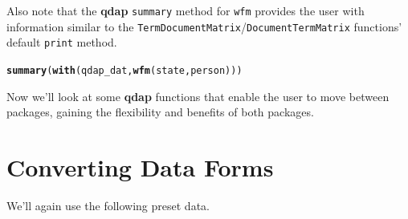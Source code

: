 \documentclass{article}\usepackage[]{graphicx}\usepackage[]{color}
\makeatletter
\newcommand{\hlstd}[1]{\textcolor[rgb]{0.345,0.345,0.345}{#1}}%
\newcommand{\hlkwd}[1]{\textcolor[rgb]{0.737,0.353,0.396}{\textbf{#1}}}%
\newenvironment{kframe}{%
 \def\at@end@of@kframe{}%
 \ifinner\ifhmode%
  \def\at@end@of@kframe{\end{minipage}}%
  \begin{minipage}{\columnwidth}%
 \fi\fi%
 \def\FrameCommand##1{\hskip\@totalleftmargin \hskip-\fboxsep
 \colorbox{shadecolor}{##1}\hskip-\fboxsep
     \hskip-\linewidth \hskip-\@totalleftmargin \hskip\columnwidth}%
 \MakeFramed {\advance\hsize-\width
   \@totalleftmargin\z@ \linewidth\hsize
   \@setminipage}}%
 {\par\unskip\endMakeFramed%
 \at@end@of@kframe}
\newenvironment{knitrout}{}{} %
\makeatother
\begin{document}
Also note that the \textbf{qdap} \texttt{summary} method for \texttt{wfm} provides the user with information similar to the \texttt{TermDocumentMatrix}/\texttt{DocumentTermMatrix} functions' default \texttt{print} method.


\begin{knitrout}
\color{fgcolor}\begin{kframe}
\begin{alltt}
\hlkwd{summary}\hlstd{(}\hlkwd{with}\hlstd{(qdap_dat,} \hlkwd{wfm}\hlstd{(state, person)))}
\end{alltt}
\end{kframe}
\end{knitrout}


\begin{knitrout}
\color{fgcolor}\begin{kframe}


{\ttfamily\noindent\itshape\color{messagecolor}{\#\# A word-frequency matrix (16 terms, 5 groups)\\\#\# \\\#\# \\\#\# Non-/sparse entries\ \ \ \ \ \  : 17/63\\\#\# Sparsity\ \ \ \ \ \ \ \ \ \ \ \ \ \ \ \ \ \ : 79\%\\\#\# Maximal term length\ \ \ \ \ \  : 8\\\#\# Less than four characters : 56\%\\\#\# Hapax legomenon\ \ \ \ \ \ \ \ \ \  : 13(81\%)\\\#\# Dis legomenon\ \ \ \ \ \ \ \ \ \ \ \  : 3(19\%)\\\#\# Shannon's diversity index : 2.73}}\end{kframe}
\end{knitrout}


Now we'll look at some \textbf{qdap} functions that enable the user to move between packages, gaining the flexibility and benefits of both packages.


\section{Converting Data Forms}

\hspace{.4cm} We'll again use the following preset data.
\end{document}

